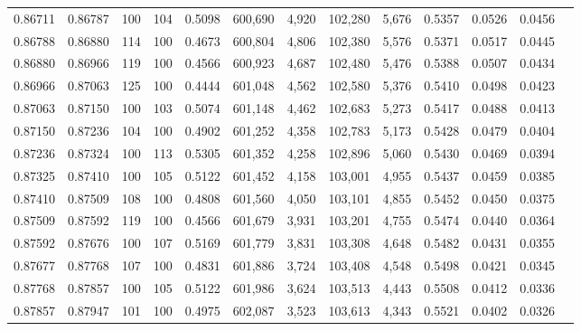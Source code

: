 \begin{tabular}{rrrrrrrrrrrrr}
0.86711 & 0.86787 &   100 & 104 &                                     0.5098 & 600,690 &   4,920 & 102,280 &   5,676 & 0.5357 & 0.0526 & 0.0456 \\
0.86788 & 0.86880 &   114 & 100 &                                     0.4673 & 600,804 &   4,806 & 102,380 &   5,576 & 0.5371 & 0.0517 & 0.0445 \\
0.86880 & 0.86966 &   119 & 100 &                                     0.4566 & 600,923 &   4,687 & 102,480 &   5,476 & 0.5388 & 0.0507 & 0.0434 \\
0.86966 & 0.87063 &   125 & 100 &                                     0.4444 & 601,048 &   4,562 & 102,580 &   5,376 & 0.5410 & 0.0498 & 0.0423 \\
0.87063 & 0.87150 &   100 & 103 &                                     0.5074 & 601,148 &   4,462 & 102,683 &   5,273 & 0.5417 & 0.0488 & 0.0413 \\
0.87150 & 0.87236 &   104 & 100 &                                     0.4902 & 601,252 &   4,358 & 102,783 &   5,173 & 0.5428 & 0.0479 & 0.0404 \\
0.87236 & 0.87324 &   100 & 113 &                                     0.5305 & 601,352 &   4,258 & 102,896 &   5,060 & 0.5430 & 0.0469 & 0.0394 \\
0.87325 & 0.87410 &   100 & 105 &                                     0.5122 & 601,452 &   4,158 & 103,001 &   4,955 & 0.5437 & 0.0459 & 0.0385 \\
0.87410 & 0.87509 &   108 & 100 &                                     0.4808 & 601,560 &   4,050 & 103,101 &   4,855 & 0.5452 & 0.0450 & 0.0375 \\
0.87509 & 0.87592 &   119 & 100 &                                     0.4566 & 601,679 &   3,931 & 103,201 &   4,755 & 0.5474 & 0.0440 & 0.0364 \\
0.87592 & 0.87676 &   100 & 107 &                                     0.5169 & 601,779 &   3,831 & 103,308 &   4,648 & 0.5482 & 0.0431 & 0.0355 \\
0.87677 & 0.87768 &   107 & 100 &                                     0.4831 & 601,886 &   3,724 & 103,408 &   4,548 & 0.5498 & 0.0421 & 0.0345 \\
0.87768 & 0.87857 &   100 & 105 &                                     0.5122 & 601,986 &   3,624 & 103,513 &   4,443 & 0.5508 & 0.0412 & 0.0336 \\
0.87857 & 0.87947 &   101 & 100 &                                     0.4975 & 602,087 &   3,523 & 103,613 &   4,343 & 0.5521 & 0.0402 & 0.0326 \\

\end{tabular}
